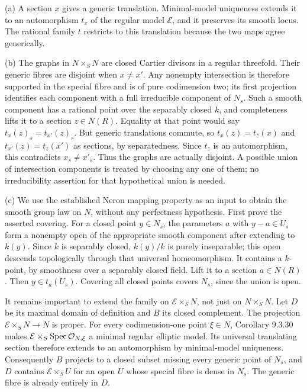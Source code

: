 \documentclass[11pt]{article}
\let\chapterexercise\exercise
\renewcommand{\exercise}[2]{\Needspace{8\baselineskip}\chapterexercise{#1}{#2}}
\begin{document}
\pf (a) A section $x$ gives a generic translation. Minimal-model uniqueness extends it to an automorphism $t_x$ of the regular model $\mathcal E$, and it preserves its smooth locus. The rational family $t$ restricts to this translation because the two maps agree generically.

(b) The graphs in $N\times_SN$ are closed Cartier divisors in a regular threefold. Their generic fibres are disjoint when $x\ne x'$. Any nonempty intersection is therefore supported in the special fibre and is of pure codimension two; its first projection identifies each component with a full irreducible component of $N_s$. Such a smooth component has a rational point over the separably closed $k$, and completeness lifts it to a section $z\in N(R)$. Equality at that point would say $t_x(z)_s=t_{x'}(z)_s$. But generic translations commute, so $t_x(z)=t_z(x)$ and $t_{x'}(z)=t_z(x')$ as sections, by separatedness. Since $t_z$ is an automorphism, this contradicts $x_s\ne x'_s$. Thus the graphs are actually disjoint. A possible union of intersection components is treated by choosing any one of them; no irreducibility assertion for that hypothetical union is needed.

(c) We use the established Neron mapping property as an input to obtain the smooth group law on $N$, without any perfectness hypothesis. First prove the asserted covering. For a closed point $y\in N_s$, the parameters $a$ with $y-a\in U_s$ form a nonempty open of the appropriate smooth component after extending to $k(y)$. Since $k$ is separably closed, $k(y)/k$ is purely inseparable; this open descends topologically through that universal homeomorphism. It contains a $k$-point, by smoothness over a separably closed field. Lift it to a section $a\in N(R)$. Then $y\in t_a(U_s)$. Covering all closed points covers $N_s$, since the union is open.

It remains important to extend the family on $\mathcal E\times_SN$, not just on $N\times_SN$. Let $D$ be its maximal domain of definition and $B$ its closed complement. The projection $\mathcal E\times_SN\to N$ is proper. For every codimension-one point $\xi\in N$, Corollary 9.3.30 makes $\mathcal E\times_S\operatorname{Spec}\mathcal O_{N,\xi}$ a minimal regular elliptic model. Its universal translating section therefore extends to an automorphism by minimal-model uniqueness. Consequently $B$ projects to a closed subset missing every generic point of $N_s$, and $D$ contains $\mathcal E\times_SU$ for an open $U$ whose special fibre is dense in $N_s$. The generic fibre is already entirely in $D$.
\end{document}
